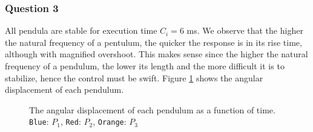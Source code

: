 \subsubsection{Question 3}

All pendula are stable for execution time $C_i = 6$ ms. We observe that the
higher the natural frequency of a pentulum, the quicker the response is in its
rise time, although with magnified overshoot. This makes sense since the higher
the natural frequency of a pendulum, the lower its length and the more difficult
it is to stabilize, hence the control must be swift. Figure \ref{fig:02.3} shows
the angular displacement of each pendulum.

\begin{figure}[H]\centering
  \scalebox{1}{}
  \caption{The angular displacement of each pendulum as a function of time.
    \texttt{Blue}: $P_1$, \texttt{Red}: $P_2$, \texttt{Orange}: $P_3$}
  \label{fig:02.3}
\end{figure}

